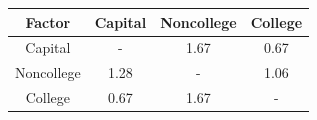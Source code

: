 \begin{table}[!ht]
\setlength\tabcolsep{0.425em}
\setlength\aboverulesep{0pt}
\setlength\belowrulesep{0.2em}
\centering
\begin{threeparttable}
\begin{tabular}{cccc}
\toprule[0.1em]
Factor & Capital & Noncollege & College \\[0.2em]
\midrule[0.075em]
Capital & - & 1.67 & 0.67 \\[0.2em]
Noncollege & 1.28 & - & 1.06 \\[0.2em]
College & 0.67 & 1.67 & - \\[0.2em]
\bottomrule[0.1em]
\end{tabular}
\end{threeparttable}
\end{table}

